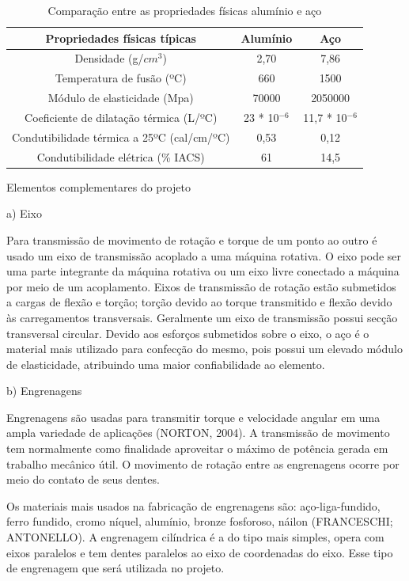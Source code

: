 \begin{table}[h]
	\centering
	\label{compaco}	
	\begin{tabular}{ccc}
		\toprule
		\textbf{Propriedades físicas típicas} & \textbf{Alumínio} & \textbf{Aço} \\
		\midrule
Densidade (g/$cm^3$) & 2,70 & 7,86 \\
Temperatura de fusão (ºC) & 660 & 1500 \\
Módulo de elasticidade (Mpa) & 70000 & 2050000 \\
Coeficiente de dilatação térmica (L/ºC)& 23 * 10$^{-6}$ & 11,7 * 10$^{-6}$ \\
Condutibilidade térmica a 25ºC (cal/cm/ºC) & 0,53 & 0,12 \\
Condutibilidade elétrica (\% IACS) & 61 & 14,5 \\
		\bottomrule
	\end{tabular}	
	\caption{Comparação entre as propriedades físicas alumínio e aço}
\end{table}

Elementos complementares do projeto

a) Eixo

Para transmissão de movimento de rotação e torque de um 
ponto ao outro é usado um eixo de transmissão acoplado a uma máquina rotativa. O eixo pode ser uma parte integrante da máquina rotativa ou um eixo livre conectado a máquina por meio de um acoplamento. Eixos de transmissão de rotação estão submetidos a cargas de flexão e torção; torção devido ao torque transmitido e flexão devido às carregamentos transversais. Geralmente um eixo de transmissão possui secção transversal circular. Devido aos esforços submetidos sobre o eixo, o aço é o material mais utilizado para confecção do mesmo, pois possui um elevado módulo de elasticidade, atribuindo uma maior confiabilidade ao elemento. 

b) Engrenagens

Engrenagens são usadas para transmitir torque e velocidade angular em uma ampla variedade de aplicações (NORTON, 2004). A transmissão de movimento tem normalmente como finalidade aproveitar o máximo de potência gerada em trabalho mecânico útil. O movimento de rotação entre as engrenagens ocorre por meio do contato de seus dentes.

Os materiais mais usados na fabricação de engrenagens são: aço-liga-fundido, ferro fundido, cromo níquel, alumínio, bronze fosforoso, náilon (FRANCESCHI; ANTONELLO).
A engrenagem cilíndrica é a do tipo mais simples, opera com eixos paralelos e tem dentes paralelos ao eixo de coordenadas do eixo. Esse tipo de engrenagem que será utilizada no projeto.

